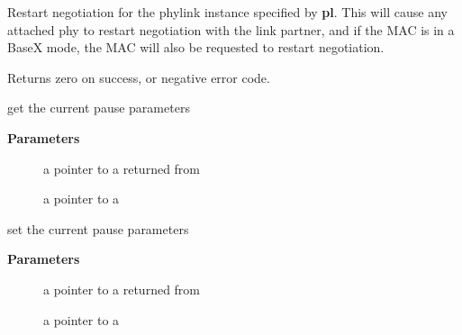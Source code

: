 \documentclass[a4paper,8pt,english]{sphinxmanual}
\begin{document}
Restart negotiation for the phylink instance specified by \textbf{pl}. This will
cause any attached phy to restart negotiation with the link partner, and
if the MAC is in a BaseX mode, the MAC will also be requested to restart
negotiation.

Returns zero on success, or negative error code.

\begin{fulllineitems}
\label{networking/kapi:c.phylink_ethtool_get_pauseparam}
get the current pause parameters

\end{fulllineitems}


\textbf{Parameters}
\begin{description}
\item[{}] \leavevmode
a pointer to a {\hyperref[networking/kapi:c.phylink]{\emph{}}} returned from {\hyperref[networking/kapi:c.phylink_create]{\emph{}}}

\item[{}] \leavevmode
a pointer to a 

\end{description}

\begin{fulllineitems}
\label{networking/kapi:c.phylink_ethtool_set_pauseparam}
set the current pause parameters

\end{fulllineitems}


\textbf{Parameters}
\begin{description}
\item[{}] \leavevmode
a pointer to a {\hyperref[networking/kapi:c.phylink]{\emph{}}} returned from {\hyperref[networking/kapi:c.phylink_create]{\emph{}}}

\item[{}] \leavevmode
a pointer to a 

\end{description}
\end{document}
